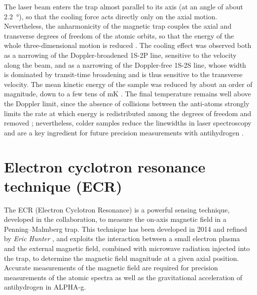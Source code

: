 The laser beam enters the trap almost parallel to its axis (at an angle of about \SI{2.2}{\degree}), so that the cooling force acts directly only on the axial motion. Nevertheless, the anharmonicity of the magnetic trap couples the axial and transverse degrees of freedom of the atomic orbits, so that the energy of the whole three-dimensional motion is reduced \cite{Evans:2022thesis}. The cooling effect was observed both as a narrowing of the Doppler-broadened 1S-2P line, sensitive to the velocity along the beam, and as a narrowing of the Doppler-free 1S-2S line, whose width is dominated by transit-time broadening and is thus sensitive to the transverse velocity. The mean kinetic energy of the sample was reduced by about an order of magnitude, down to a few tens of \si{\milli\kelvin} \cite{Baker:2021ncj,Evans:2022thesis}. The final temperature remains well above the Doppler limit, since the absence of collisions between the anti-atoms strongly limits the rate at which energy is redistributed among the degrees of freedom and removed \cite{Evans:2022thesis}; nevertheless, colder samples reduce the linewidths in laser spectroscopy and are a key ingredient for future precision measurements with antihydrogen \cite{Evans:2022thesis}.

\section{Electron cyclotron resonance technique (ECR)} \label{sec:ECRtecnique}

The ECR (Electron Cyclotron Resonance) is a powerful sensing technique, developed in the \ALPHA collaboration, to measure the on-axis magnetic field in a Penning--Malmberg trap. This technique has been developed in 2014 \cite{Amole:2014lna} and refined by \textit{Eric Hunter} \cite{Hunter_2020}, and exploits the interaction between a small electron plasma and the external magnetic field, combined with microwave radiation injected into the trap, to determine the magnetic field magnitude at a given axial position. Accurate measurements of the magnetic field are required for precision measurements of the atomic spectra as well as the gravitational acceleration of antihydrogen in ALPHA-g.


